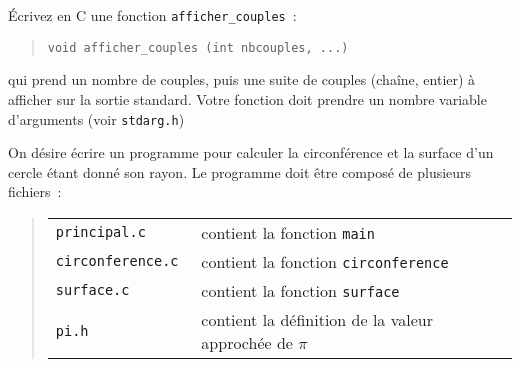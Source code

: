 %



% 


\question

Écrivez en C une fonction {\tt afficher\_couples}~:

\begin {quote}
    \verb|void afficher_couples (int nbcouples, ...)|
\end {quote}

qui prend un nombre de couples, puis une suite de couples
(chaîne, entier) à afficher sur la sortie standard. Votre fonction
doit prendre un nombre variable d'arguments (voir \texttt {stdarg.h})


\question

On désire écrire un programme pour calculer la circonférence et la
surface d'un cercle étant donné son rayon.  Le programme doit être
composé de plusieurs fichiers~:

\begin {quote}
    \renewcommand {\arraystretch} {1}
    \begin {tabular} {ll}
	\tt principal.c & contient la fonction {\tt main} \\
	\tt circonference.c & contient la fonction {\tt circonference} \\
	\tt surface.c & contient la fonction {\tt surface} \\
	\tt pi.h & contient la définition de la valeur approchée de $\pi$
    \end {tabular}
\end {quote}


